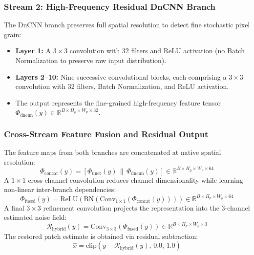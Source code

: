 \documentclass{ieeeaccess}
\begin{document}
\subsubsection{Stream 2: High-Frequency Residual DnCNN Branch}
The DnCNN branch preserves full spatial resolution to detect fine stochastic pixel grain:
\begin{itemize}
    \item \textbf{Layer 1:} A $3 \times 3$ convolution with 32 filters and ReLU activation (no Batch Normalization to preserve raw input distribution).
    \item \textbf{Layers 2--10:} Nine successive convolutional blocks, each comprising a $3 \times 3$ convolution with 32 filters, Batch Normalization, and ReLU activation.
    \item The output represents the fine-grained high-frequency feature tensor $\Phi_{\text{dncnn}}(y) \in \mathbb{R}^{B \times H_p \times W_p \times 32}$.
\end{itemize}

\subsubsection{Cross-Stream Feature Fusion and Residual Output}
The feature maps from both branches are concatenated at native spatial resolution:
\begin{equation}
\Phi_{\text{concat}}(y) = \left[ \Phi_{\text{unet}}(y) \, \parallel \, \Phi_{\text{dncnn}}(y) \right] \in \mathbb{R}^{B \times H_p \times W_p \times 64}
\end{equation}
A $1 \times 1$ cross-channel convolution reduces channel dimensionality while learning non-linear inter-branch dependencies:
\begin{equation}
\Phi_{\text{fused}}(y) = \text{ReLU}\left( \text{BN}\left( \text{Conv}_{1 \times 1}(\Phi_{\text{concat}}(y)) \right) \right) \in \mathbb{R}^{B \times H_p \times W_p \times 64}
\end{equation}
A final $3 \times 3$ refinement convolution projects the representation into the 3-channel estimated noise field:
\begin{equation}
\mathcal{R}_{\text{hybrid}}(y) = \text{Conv}_{3 \times 3}(\Phi_{\text{fused}}(y)) \in \mathbb{R}^{B \times H_p \times W_p \times 3}
\end{equation}
The restored patch estimate is obtained via residual subtraction:
\begin{equation}
\hat{x} = \text{clip}\left( y - \mathcal{R}_{\text{hybrid}}(y), \, 0.0, \, 1.0 \right)
\end{equation}
\end{document}
